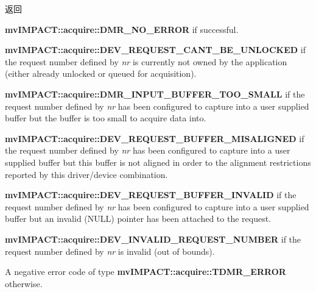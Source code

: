 \begin{DoxyReturn}{返回}

\begin{DoxyItemize}
\item {\bfseries mv\+I\+M\+P\+A\+C\+T\+::acquire\+::\+D\+M\+R\+\_\+\+N\+O\+\_\+\+E\+R\+R\+O\+R} if successful.
\item {\bfseries mv\+I\+M\+P\+A\+C\+T\+::acquire\+::\+D\+E\+V\+\_\+\+R\+E\+Q\+U\+E\+S\+T\+\_\+\+C\+A\+N\+T\+\_\+\+B\+E\+\_\+\+U\+N\+L\+O\+C\+K\+E\+D} if the request number defined by {\itshape nr} is currently not owned by the application (either already unlocked or queued for acquisition).
\item {\bfseries mv\+I\+M\+P\+A\+C\+T\+::acquire\+::\+D\+M\+R\+\_\+\+I\+N\+P\+U\+T\+\_\+\+B\+U\+F\+F\+E\+R\+\_\+\+T\+O\+O\+\_\+\+S\+M\+A\+L\+L} if the request number defined by {\itshape nr} has been configured to capture into a user supplied buffer but the buffer is too small to acquire data into.
\item {\bfseries mv\+I\+M\+P\+A\+C\+T\+::acquire\+::\+D\+E\+V\+\_\+\+R\+E\+Q\+U\+E\+S\+T\+\_\+\+B\+U\+F\+F\+E\+R\+\_\+\+M\+I\+S\+A\+L\+I\+G\+N\+E\+D} if the request number defined by {\itshape nr} has been configured to capture into a user supplied buffer but this buffer is not aligned in order to the alignment restrictions reported by this driver/device combination.
\item {\bfseries mv\+I\+M\+P\+A\+C\+T\+::acquire\+::\+D\+E\+V\+\_\+\+R\+E\+Q\+U\+E\+S\+T\+\_\+\+B\+U\+F\+F\+E\+R\+\_\+\+I\+N\+V\+A\+L\+I\+D} if the request number defined by {\itshape nr} has been configured to capture into a user supplied buffer but an invalid (N\+U\+L\+L) pointer has been attached to the request.
\item {\bfseries mv\+I\+M\+P\+A\+C\+T\+::acquire\+::\+D\+E\+V\+\_\+\+I\+N\+V\+A\+L\+I\+D\+\_\+\+R\+E\+Q\+U\+E\+S\+T\+\_\+\+N\+U\+M\+B\+E\+R} if the request number defined by {\itshape nr} is invalid (out of bounds).
\item A negative error code of type {\bfseries mv\+I\+M\+P\+A\+C\+T\+::acquire\+::\+T\+D\+M\+R\+\_\+\+E\+R\+R\+O\+R} otherwise. 
\end{DoxyItemize}
\end{DoxyReturn}

